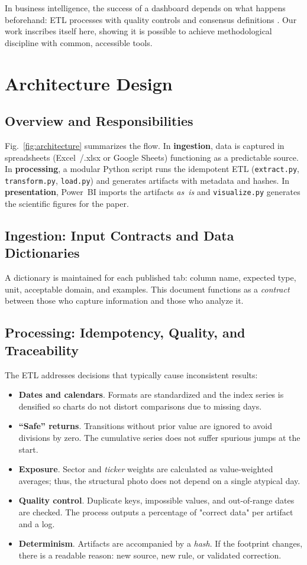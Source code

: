 \documentclass[conference]{IEEEtran}
\begin{document}
In business intelligence, the success of a dashboard depends on what happens beforehand: ETL processes with quality controls and consensus definitions \cite{novoa2019}. Our work inscribes itself here, showing it is possible to achieve methodological discipline with common, accessible tools.

\section{Architecture Design}
\subsection{Overview and Responsibilities}
Fig.~\ref{fig:architecture} summarizes the flow. In \textbf{ingestion}, data is captured in spreadsheets (Excel~/.xlsx or Google Sheets) functioning as a predictable source. In \textbf{processing}, a modular Python script runs the idempotent ETL (\texttt{extract.py}, \texttt{transform.py}, \texttt{load.py}) and generates artifacts with metadata and hashes. In \textbf{presentation}, Power~BI imports the artifacts \emph{as~is} and \texttt{visualize.py} generates the scientific figures for the paper.

\subsection{Ingestion: Input Contracts and Data Dictionaries}
A dictionary is maintained for each published tab: column name, expected type, unit, acceptable domain, and examples. This document functions as a \emph{contract} between those who capture information and those who analyze it.

\subsection{Processing: Idempotency, Quality, and Traceability}
The ETL addresses decisions that typically cause inconsistent results:
\begin{itemize}
  \item \textbf{Dates and calendars}. Formats are standardized and the index series is densified so charts do not distort comparisons due to missing days.
  \item \textbf{“Safe” returns}. Transitions without prior value are ignored to avoid divisions by zero. The cumulative series does not suffer spurious jumps at the start.
  \item \textbf{Exposure}. Sector and \emph{ticker} weights are calculated as value-weighted averages; thus, the structural photo does not depend on a single atypical day.
  \item \textbf{Quality control}. Duplicate keys, impossible values, and out-of-range dates are checked. The process outputs a percentage of "correct data" per artifact and a log.
  \item \textbf{Determinism}. Artifacts are accompanied by a \emph{hash}. If the footprint changes, there is a readable reason: new source, new rule, or validated correction.
\end{itemize}
\end{document}
